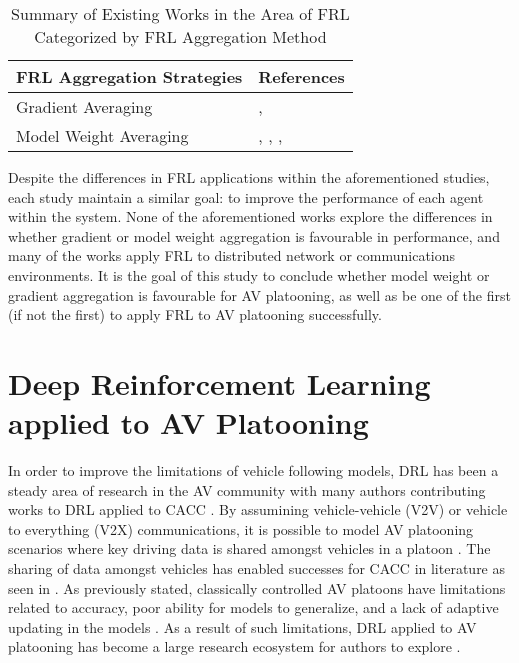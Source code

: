 \begin{table}[H]
  \centering
  \caption{Summary of Existing Works in the Area of FRL Categorized by FRL Aggregation Method}
    \begin{tabular}{ll} \toprule
    \textbf{FRL Aggregation Strategies} & \textbf{References} \\ \midrule
    \midrule
    Gradient Averaging & \cite{BrendanMcMahan2017a}, \cite{LimHyun2021} \\
    Model Weight Averaging & \cite{Liang2019}, \cite{ZhangX2020}, \cite{WangXiaofei2021}, \cite{Huang2021} \\ \bottomrule
    \end{tabular}%
  \label{tab:addlabel}%
\end{table}%


Despite the differences in FRL applications within the aforementioned studies, each study
maintain a similar goal: to improve the performance of each agent within the system.  None
of the aforementioned works explore the differences in whether gradient or model weight
aggregation is favourable in performance, and many of the works apply FRL to distributed
network or communications environments.  It is the goal of this study to conclude whether
model weight or gradient aggregation is favourable for AV platooning, as well as be one of
the first (if not the first) to apply FRL to AV platooning successfully.

\section{Deep Reinforcement Learning applied to AV Platooning} \label{sec:avRL}

In order to improve the limitations of vehicle following models, DRL has been a
steady area of research in the AV community with many authors contributing works
to DRL applied to CACC \cite{Schwarting2018, Li2019, Kendall2019, zhangYuxiang2020}.
By assumining vehicle-vehicle (V2V) or
vehicle to everything (V2X) communications, it is possible to model AV platooning scenarios
where key driving data is shared amongst vehicles in a platoon \cite{Schwarting2018,Hussain2019}.
The sharing of data amongst vehicles has enabled successes for CACC in literature as seen in \cite{LeiV2x}.
As previously stated, classically controlled AV platoons have limitations related to
accuracy, poor ability for models to generalize, and a lack of adaptive updating in the models \cite{Zhu2018}.
As a result of such limitations, DRL applied to AV platooning has become a large
research ecosystem for authors to explore \cite{Vinitsky2018, Kiran2020}.


